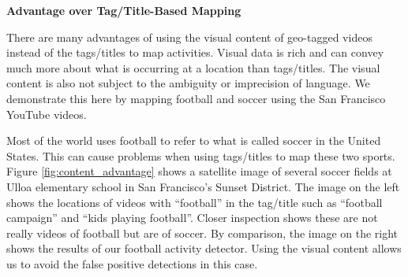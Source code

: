 \documentclass[sigconf]{acmart}
\begin{document}
	\noindent \textbf{Advantage over Tag/Title-Based Mapping}
	
	There are many advantages of using the visual content of geo-tagged videos instead of the tags/titles to map activities. Visual data is rich and can convey much more about what is occurring at a location than tags/titles. The visual content is also not subject to the ambiguity or imprecision of language. We demonstrate this here by mapping football and soccer using the San Francisco YouTube videos.  
	
	Most of the world uses football to refer to what is called soccer in the United States. This can cause problems when using tags/titles to map these two sports. Figure \ref{fig:content_advantage} shows a satellite image of several soccer fields at Ulloa elementary school in San Francisco's Sunset District. The image on the left shows the locations of videos with ``football'' in the tag/title such as ``football campaign'' and ``kids playing football''. Closer inspection shows these are not really videos of football but are of soccer. By comparison, the image on the right shows the results of our football activity detector. Using the visual content allows us to avoid the false positive detections in this case.
	
	
	
	
	
\end{document}
